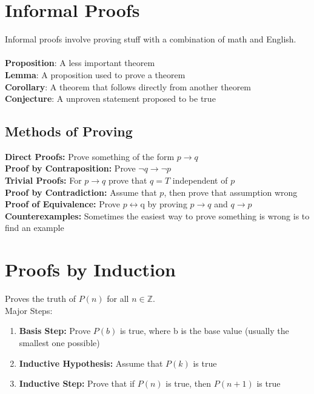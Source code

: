 \documentclass[letter]{article}
\begin{document}
\begin{multicols}{2}

	\section{Informal Proofs}
	Informal proofs involve proving stuff with a combination of math and English.\\\\
	\textbf{Proposition}: A less important theorem\\
	\textbf{Lemma}: A proposition used to prove a theorem\\
	\textbf{Corollary}: A theorem that follows directly from another theorem\\
	\textbf{Conjecture}: A unproven statement proposed to be true\\

	\subsection{Methods of Proving}
	\textbf{Direct Proofs:} Prove something of the form $p \rightarrow q$\\
	\textbf{Proof by Contraposition:} Prove $\neg q \rightarrow \neg p$\\
	\textbf{Trivial Proofs:} For $p \rightarrow q$ prove that $q = T$ independent of $p$\\
	\textbf{Proof by Contradiction:} Assume that $p$, then prove that assumption wrong\\
	\textbf{Proof of Equivalence:} Prove $p \leftrightarrow $q by proving $p \rightarrow q$ and $q \rightarrow p$\\
	\textbf{Counterexamples:} Sometimes the easiest way to prove something is wrong is to find an example\\

	\section{Proofs by Induction}
	Proves the truth of $P(n)$ for all $n \in \mathbb{Z}$.\\
	Major Steps:
	\begin{enumerate}
		\item \textbf{Basis Step:} Prove $P(b)$ is true, where b is the base value (usually the smallest one possible)
		\item \textbf{Inductive Hypothesis:} Assume that $P(k)$ is true
		\item \textbf{Inductive Step:} Prove that if $P(n)$ is true, then $P(n + 1)$ is true
	\end{enumerate}

\end{multicols}
\end{document}
